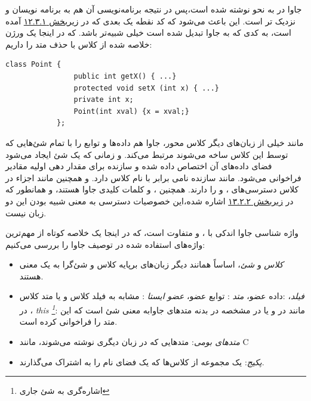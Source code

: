 \documentclass[a4paper,12pt]{report}
\newcommand{\lrm}[1]{{\color{steelBlue}\lr{\texttt{#1}}}}
\begin{document}
 	جاوا در به نحو 
 	نوشته شده است،‌پس در نتیجه برنامه‌نویسی آن هم به برنامه نویسان 
 	 و 
 	نزدیک تر است. این باعث می‌شود که کد نقطه یک بعدی که در 
 	\hyperref[subsec1:sec3:chap12]{
	زیربخش ۱۲.۳.۱} آمده است، به کدی که به جاوا تبدیل شده است خیلی شبیه‌تر باشد. که در اینجا یک ورژن خلاصه شده از کلاس با حذف متد 
 	را داریم:
 		
	\begin{latin}
		\small
		\begin{lstlisting}[]
			class Point {
				public int getX() { ...}
				protected void setX (int x) { ...}
				private int x;
				Point(int xval) {x = xval;}
			};		
		\end{lstlisting}
	\end{latin}	
			
	مانند خیلی از زبان‌های دیگر کلاس محور، جاوا هم داده‌ها و توابع را با تمام شئ‌هایی که توسط این کلاس ساخه می‌شوند مرتبط می‌کند. و زمانی که یک شئ ایجاد می‌شود فضای داده‌های آن اختصاص داده شده و سازنده برای مقدار دهی اولیه مقادیر فراخوانی می‌شود. مانند 
	سازنده نامی برابر با نام  کلاس دارد. و همچنین مانند 
	اجزاء در کلاس 
	 ‌دسترسی‌های
	،  و 
	 را دارند.
	  همچنین
	،  و 
		کلمات کلیدی جاوا هستند، و همانطور که در 
	\linebreak\hyperref[subsec2:sec2:chap13]{زیربخش ۱۳.۲.۲} 
اشاره شده،‌این خصوصیات دسترسی به معنی شبیه بودن این دو زبان نیست.

	واژه شناسی جاوا اندکی با
	،  و 
	متفاوت است، که در اینجا یک خلاصه کوتاه از مهم‌ترین واژه‌های استفاده شده در توصیف جاوا را بررسی می‌کنیم:
	
	
	\begin{itemize}[nosep]
		\renewcommand{\labelitemi}{\color{gray}\scriptsize$\blacksquare$}
		\item \textit{
		کلاس} و \textit{شئ}، اساساً همانند دیگر زبان‌های برپایه کلاس و شئ‌گرا به یک معنی هستند.
		
		\item \textit{
		فیلد}،
		:داده عضو،
		\textit{
		متد
		}: توابع عضو، 
		\textit{
		عضو ایستا
		}
		: مشابه به فیلد کلاس و یا متد کلاس در 
		 ،
		\textit{
		this \footnote{
		اشاره‌گری به شئ جاری}}: مانند 
		\lrm{this} در  
		و یا 
		\lrm{self} در  
		مشخصه
		 \lrm{this}
		  در بدنه متد‌های جاوابه معنی شئ است که این متد را فراخوانی کرده است.
		\item \textit{
		متدهای بومی}: متدهایی که در زبان دیگری نوشته می‌شوند، مانند C
		\item \textit{
		پکیج‌}: یک مجموعه از کلاس‌ها که یک فضای نام را به اشتراک می‌گذارند.
	\end{itemize}
\end{document}
